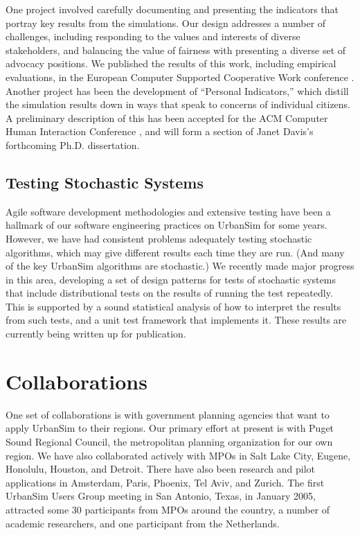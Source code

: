\documentclass{acm_proc_article-sp}
\begin{document}
One project involved carefully documenting and presenting the indicators
that portray key results from the simulations. Our design addresses a
number of challenges, including responding to the values and interests of
diverse stakeholders,  and balancing the
value of fairness with presenting a diverse set of advocacy positions.  We
published the results of this work, including empirical evaluations, in the
European Computer Supported Cooperative Work conference
\cite{borning-ecscw-2005}.  
Another project has been the development of ``Personal Indicators,'' which
distill the simulation results down in ways that speak to concerns of
individual citizens.
A preliminary description of this has been accepted for the
ACM Computer Human Interaction Conference \cite{davis-chi-2006}, 
and will form a section
of Janet Davis's forthcoming Ph.D. dissertation.

\subsection{Testing Stochastic Systems}

Agile software development methodologies and extensive testing have been a
hallmark of our software engineering practices on UrbanSim for some years.
However, we have had consistent problems
adequately testing stochastic algorithms, which may give different results
each time they are run.  (And many of the key UrbanSim algorithms are
stochastic.)  We recently made major progress in this area, developing a
set of design patterns for tests of stochastic systems that include
distributional tests on the results of running the test repeatedly.  This
is supported by a sound statistical analysis of how to interpret the
results from such tests, and a unit test framework that implements it.
These results are currently being written up for publication.

\section{Collaborations}

One set of collaborations is with government planning agencies that want to
apply UrbanSim to their regions.  Our primary effort at present is with
Puget Sound Regional Council, the metropolitan planning organization for
our own region.  We have also collaborated actively with MPOs in Salt Lake
City, Eugene, Honolulu, Houston, and Detroit.  
There have also been research and pilot applications in Amsterdam,  Paris,
Phoenix, Tel Aviv, and Zurich.
The first UrbanSim Users Group meeting in San Antonio,
Texas, in January 2005, attracted some 30 participants from MPOs around the
country, a number of academic researchers, and one participant from the
Netherlands.
\end{document}

